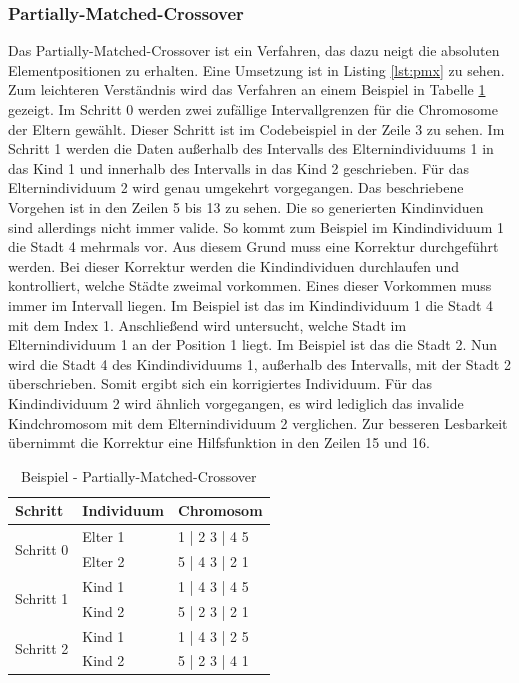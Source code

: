 \subsubsection{Partially-Matched-Crossover}
Das Partially-Matched-Crossover \cite[S. 273]{schoeneburg} ist ein Verfahren, das dazu neigt die absoluten Elementpositionen zu erhalten. Eine Umsetzung ist in Listing \ref{lst:pmx} zu sehen. Zum leichteren Verständnis wird das Verfahren an einem Beispiel in Tabelle \ref{tab:pmx} gezeigt.
Im Schritt 0 werden zwei zufällige Intervallgrenzen für die Chromosome der Eltern gewählt. Dieser Schritt ist im Codebeispiel in der Zeile 3 zu sehen.
Im Schritt 1 werden die Daten außerhalb des Intervalls des Elternindividuums 1 in das Kind 1 und innerhalb des Intervalls in das Kind 2 geschrieben. Für das Elternindividuum 2 wird genau umgekehrt vorgegangen. Das beschriebene Vorgehen ist in den Zeilen 5 bis 13 zu sehen.
Die so generierten Kindinviduen sind allerdings nicht immer valide. So kommt zum Beispiel im Kindindividuum 1 die Stadt 4 mehrmals vor. Aus diesem Grund muss eine Korrektur durchgeführt werden.
Bei dieser Korrektur werden die Kindindividuen durchlaufen und kontrolliert, welche Städte zweimal vorkommen. Eines dieser Vorkommen muss immer im Intervall liegen. Im Beispiel ist das im Kindindividuum 1 die Stadt 4 mit dem Index 1. Anschließend wird untersucht, welche Stadt im Elternindividuum 1 an der Position 1 liegt. Im Beispiel ist das die Stadt 2. Nun wird die Stadt 4 des Kindindividuums 1, außerhalb des Intervalls, mit der Stadt 2 überschrieben. Somit ergibt sich ein korrigiertes Individuum. Für das Kindindividuum 2 wird ähnlich vorgegangen, es wird lediglich das invalide Kindchromosom mit dem Elternindividuum 2 verglichen.
Zur besseren Lesbarkeit übernimmt die Korrektur eine Hilfsfunktion in den Zeilen 15 und 16.
\begin{table}[!htb]
\centering
\caption{Beispiel - Partially-Matched-Crossover}
\begin{tabularx}{0.5\textwidth}{l|l|l}
Schritt & Individuum & Chromosom\\
\hline
\multirow{2}{*}{Schritt 0}
		& Elter 1 & 1 | 2 3 | 4 5\\
		&  Elter 2 & 5 | 4 3 | 2 1\\
\hline
\multirow{2}{*}{Schritt 1}
		& Kind 1 &  1 | 4 3 | 4 5\\
		&  Kind 2 & 5 | 2 3 | 2 1\\
\hline
\multirow{2}{*}{Schritt 2}
		& Kind 1 &  1 | 4 3 | 2 5\\
		&  Kind 2 & 5 | 2 3 | 4 1\\
\end{tabularx}
\label{tab:pmx}
\end{table}

